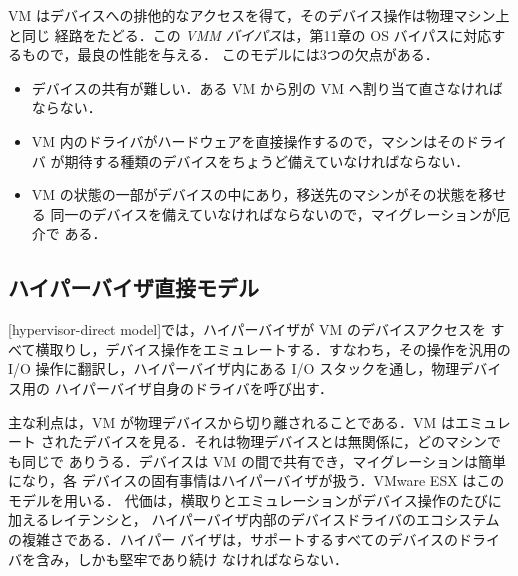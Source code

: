 \documentclass[../main.tex]{subfiles}
\begin{document}
VM はデバイスへの排他的なアクセスを得て，そのデバイス操作は物理マシン上と同じ
経路をたどる．この \emph{VMM バイパス}は，第11章の OS
バイパスに対応するもので，最良の性能を与える．
このモデルには3つの欠点がある．
\begin{itemize}
  \item デバイスの共有が難しい．ある VM から別の VM へ割り当て直さなければ
    ならない．
  \item VM 内のドライバがハードウェアを直接操作するので，マシンはそのドライバ
    が期待する種類のデバイスをちょうど備えていなければならない．
  \item VM の状態の一部がデバイスの中にあり，移送先のマシンがその状態を移せる
    同一のデバイスを備えていなければならないので，マイグレーションが厄介で
    ある．
\end{itemize}

\subsection{ハイパーバイザ直接モデル}

\begin{definition}[ハイパーバイザ直接モデル]
  [hypervisor-direct model]では，ハイパーバイザが VM のデバイスアクセスを
  すべて横取りし，デバイス操作をエミュレートする．すなわち，その操作を汎用の
  I/O 操作に翻訳し，ハイパーバイザ内にある I/O スタックを通し，物理デバイス用の
  ハイパーバイザ自身のドライバを呼び出す．
\end{definition}

主な利点は，VM が物理デバイスから切り離されることである．VM はエミュレート
されたデバイスを見る．それは物理デバイスとは無関係に，どのマシンでも同じで
ありうる．デバイスは VM の間で共有でき，マイグレーションは簡単になり，各
デバイスの固有事情はハイパーバイザが扱う．VMware ESX はこのモデルを用いる．
代価は，横取りとエミュレーションがデバイス操作のたびに加えるレイテンシと，
ハイパーバイザ内部のデバイスドライバのエコシステムの複雑さである．ハイパー
バイザは，サポートするすべてのデバイスのドライバを含み，しかも堅牢であり続け
なければならない．
\end{document}
